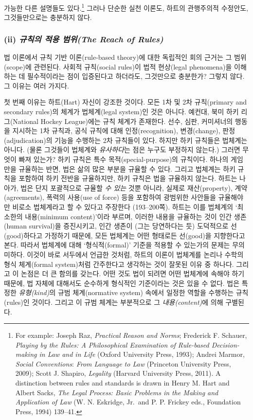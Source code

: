 \documentclass[12pt, oneside]{book}  %
\begin{document}
가능한 다른 설명들도 있다.\footnote{For example: Joseph Raz,
  \emph{Practical Reason and Norms}; Frederick F. Schauer, \emph{Playing
  by the Rules: A Philosophical Examination of Rule-based
  Decision-making in Law and in Life} (Oxford University Press, 1993);
  Andrei Marmor, \emph{Social Conventions}: \emph{From Language to Law}
  (Princeton University Press, 2009); Scott J. Shapiro, \emph{Legality}
  (Harvard University Press, 2011). A distinction between rules and
  standards is drawn in Henry M. Hart and Albert Sacks, \emph{The Legal
  Process: Basic Problems in the Making and Application of Law} (W. N.
  Eskridge, Jr.~and P. P. Frickey eds., Foundation Press, 1994) 139--41.}
그러나 단순한 실천 이론도, 하트의 관행주의적 수정안도, 그것들만으로는
충분하지 않다.

\subsubsection{\texorpdfstring{(ii) \emph{규칙의 적용 범위(The Reach of
Rules)}}{(ii) 규칙의 적용 범위(The Reach of Rules)}}\label{ii-uxaddcuxce59uxc758-uxc801uxc6a9-uxbc94uxc704the-reach-of-rules}

법 이론에서 규칙 기반 이론(rule-based theory)에 대한 독립적인 회의
근거는 그 범위(scope)에 관련된다. 사회적 규칙(social rules)이 법적
현상(legal phenomena)을 이해하는 데 필수적이라는 점이 입증된다고
하더라도, 그것만으로 충분한가? 그렇지 않다. 그 이유는 여러 가지다.

첫 번째 이유는 하트(Hart) 자신이 강조한 것이다. 모든 1차 및 2차
규칙(primary and secondary rules)의 체계가 법체계(legal system)인 것은
아니다. 예컨대, 북미 하키 리그(National Hockey League)에는 규칙 체계가
존재한다. 선수, 심판, 커미셔너의 행동을 지시하는 1차 규칙과, 공식 규칙에
대해 인정(recognition), 변경(change), 판정(adjudication)의 기능을
수행하는 2차 규칙들이 있다. 하지만 하키 규칙들은 법체계는 아니다. (물론
그것들이 법체계와 \emph{유사하다}는 점은 누구도 부정하지 않는다.) 그러면
무엇이 빠져 있는가? 하키 규칙은 특수 목적(special-purpose)의 규칙이다.
하나의 게임만을 규율하는 반면, 법은 삶의 많은 부분을 규율할 수 있다.
그리고 법체계는 하키 규칙을 포함하여 하키 전반을 규율하지만, 하키 규칙은
법을 규율하지 않는다. 하트는 나아가, 법은 단지 포괄적으로 규율할
\emph{수 있는} 것뿐 아니라, 실제로 재산(property), 계약(agreements),
폭력의 사용(use of force) 등을 포함하여 광범위한 사안들을 규율해야만
비로소 법체계라고 할 수 있다고 주장한다 (193--200쪽). 하트는 이를
법체계의 `최소한의 내용(minimum content)'이라 부르며, 이러한 내용을
규율하는 것이 인간 생존(human survival)을 증진시키고, 인간 생존이 (그는
당연하다는 듯) 도덕적으로 선(good)하다고 가정하기 때문에, 모든 법체계는
어떤 형태로든 선(good)을 지향한다고 본다. 따라서 법체계에 대해
`형식적(formal)' 기준을 적용할 수 있는가의 문제는 무의미하다. 이것이
바로 서두에서 언급한 것처럼, 하트의 이론이 법체계를 논리나 수학의 형식
체계(formal system)처럼 간주한다고 생각하는 것이 잘못된 이유 중 하나다.
그리고 이 논점은 더 큰 함의를 갖는다. 어떤 것도 법이 되려면 어떤
법체계에 속해야 하기 때문에, 법 자체에 대해서도 순수하게 형식적인
기준이라는 것은 있을 수 없다. 법은 특정한 \emph{유형(kind)}의 규범
체계(normative system) 속에서 일정한 역할을 수행하는 규칙(rules)인
것이다. 그리고 이 규범 체계는 부분적으로 그 \emph{내용(content)}에 의해
구별된다.
\end{document}

